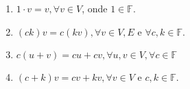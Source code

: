 \begin{definition}
	\begin{enumerate}[label={(E\arabic*)},leftmargin=0em,itemindent=*]
		\item\label{multiplicação_vetores:1}

		      \begin{math}
			      1\cdot v=
			      v,
			      \forall v\in V
		      \end{math},
		      onde $1\in\mathbb{F}$.

		\item\label{multiplicação_vetores:2}

		      \begin{math}
			      \left(ck\right)v=
			      c\left(kv\right),
			      \forall v\in V,E
			      \text{ e }
			      \forall c,k\in\mathbb{F}.
		      \end{math}

		\item\label{multiplicação_vetores:3}

		      \begin{math}
			      c\left(u+v\right)=
			      cu+cv,
			      \forall u,v\in V,
			      \forall c\in\mathbb{F}
		      \end{math}
		\item\label{multiplicação_vetores:4}

		      \begin{math}
			      \left(c+k\right)v=
			      cv+kv,
			      \forall v\in V
			      \text{ e }
			      c,k\in\mathbb{F}
		      \end{math}.
	\end{enumerate}
\end{definition}


